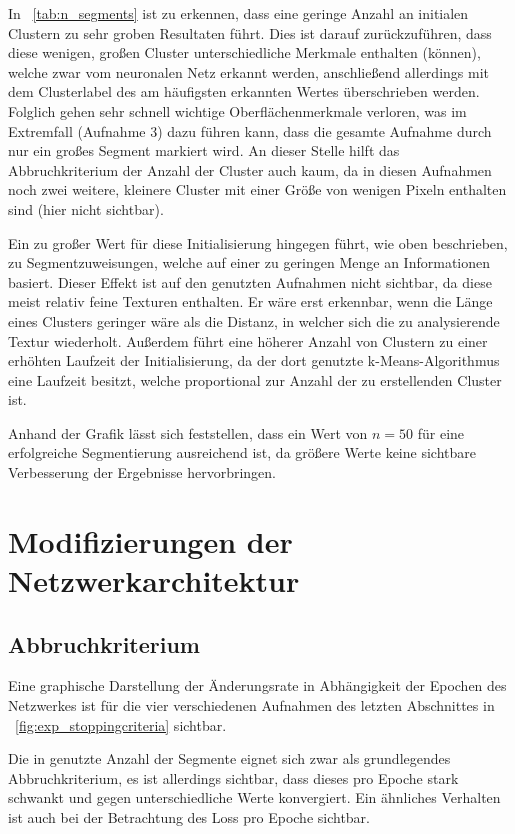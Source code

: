 In \tablename~\ref{tab:n_segments} ist zu erkennen, dass eine geringe Anzahl an initialen Clustern zu sehr groben Resultaten führt. Dies ist darauf zurückzuführen, dass diese wenigen, großen Cluster unterschiedliche Merkmale enthalten (können), welche zwar vom neuronalen Netz erkannt werden, anschließend allerdings mit dem Clusterlabel des am häufigsten erkannten Wertes überschrieben werden. Folglich gehen sehr schnell wichtige Oberflächenmerkmale verloren, was im Extremfall (\vgl Aufnahme 3) dazu führen kann, dass die gesamte Aufnahme durch nur ein großes Segment markiert wird. An dieser Stelle hilft das Abbruchkriterium der Anzahl der Cluster auch kaum, da in diesen Aufnahmen noch zwei weitere, kleinere Cluster mit einer Größe von wenigen Pixeln enthalten sind (hier nicht sichtbar).

Ein zu großer Wert für diese Initialisierung hingegen führt, wie oben beschrieben, zu Segmentzuweisungen, welche auf einer zu geringen Menge an Informationen basiert. Dieser Effekt ist auf den genutzten Aufnahmen nicht sichtbar, da diese meist relativ feine Texturen enthalten. Er wäre erst erkennbar, wenn die Länge eines Clusters geringer wäre als die Distanz, in welcher sich die zu analysierende Textur wiederholt. Außerdem führt eine höherer Anzahl von Clustern zu einer erhöhten Laufzeit der Initialisierung, da der dort genutzte k-Means-Algorithmus eine Laufzeit besitzt, welche proportional zur Anzahl der zu erstellenden Cluster ist.

Anhand der Grafik lässt sich feststellen, dass ein Wert von $n=50$ für eine erfolgreiche Segmentierung ausreichend ist, da größere Werte keine sichtbare Verbesserung der Ergebnisse hervorbringen.

\section{Modifizierungen der Netzwerkarchitektur}
\label{sec:modifications_arch}

\subsection{Abbruchkriterium}
\label{ssec:exp_stoppingcriteria}

Eine graphische Darstellung der Änderungsrate in Abhängigkeit der Epochen des Netzwerkes ist für die vier verschiedenen Aufnahmen des letzten Abschnittes in \tablename~\ref{fig:exp_stoppingcriteria} sichtbar.

Die in \cite{kanezaki_18} genutzte Anzahl der Segmente eignet sich zwar als grundlegendes Abbruchkriterium, es ist allerdings sichtbar, dass dieses pro Epoche stark schwankt und gegen unterschiedliche Werte konvergiert. Ein ähnliches Verhalten ist auch bei der Betrachtung des Loss pro Epoche sichtbar.

